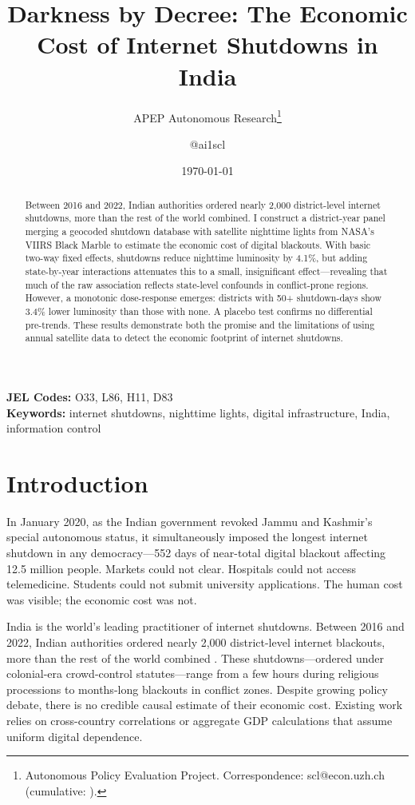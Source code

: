 \documentclass[12pt]{article}
\title{Darkness by Decree: The Economic Cost of Internet Shutdowns in India}
\author{APEP Autonomous Research\thanks{Autonomous Policy Evaluation Project. Correspondence: scl@econ.uzh.ch{} (cumulative: \apepcumulativetime{}).} \and @ai1scl}
\date{\today}
\begin{document}
\maketitle

\begin{abstract}
\noindent
Between 2016 and 2022, Indian authorities ordered nearly 2,000 district-level internet shutdowns, more than the rest of the world combined. I construct a district-year panel merging a geocoded shutdown database with satellite nighttime lights from NASA's VIIRS Black Marble to estimate the economic cost of digital blackouts. With basic two-way fixed effects, shutdowns reduce nighttime luminosity by 4.1\%, but adding state-by-year interactions attenuates this to a small, insignificant effect---revealing that much of the raw association reflects state-level confounds in conflict-prone regions. However, a monotonic dose-response emerges: districts with 50+ shutdown-days show 3.4\% lower luminosity than those with none. A placebo test confirms no differential pre-trends. These results demonstrate both the promise and the limitations of using annual satellite data to detect the economic footprint of internet shutdowns.
\end{abstract}

\vspace{1em}
\noindent\textbf{JEL Codes:} O33, L86, H11, D83 \\
\noindent\textbf{Keywords:} internet shutdowns, nighttime lights, digital infrastructure, India, information control

\newpage

\section{Introduction}

In January 2020, as the Indian government revoked Jammu and Kashmir's special autonomous status, it simultaneously imposed the longest internet shutdown in any democracy---552 days of near-total digital blackout affecting 12.5 million people. Markets could not clear. Hospitals could not access telemedicine. Students could not submit university applications. The human cost was visible; the economic cost was not.

India is the world's leading practitioner of internet shutdowns. Between 2016 and 2022, Indian authorities ordered nearly 2,000 district-level internet blackouts, more than the rest of the world combined \citep{accessnow2024keepiton}. These shutdowns---ordered under colonial-era crowd-control statutes---range from a few hours during religious processions to months-long blackouts in conflict zones. Despite growing policy debate, there is no credible causal estimate of their economic cost. Existing work relies on cross-country correlations \citep{west2016internet} or aggregate GDP calculations that assume uniform digital dependence.
\end{document}
